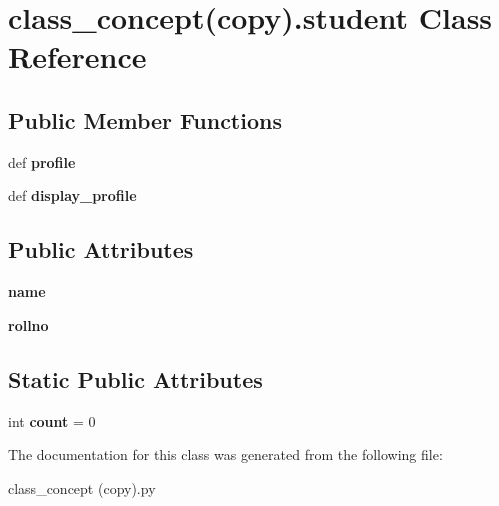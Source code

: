 \hypertarget{classclass__concept_07copy_08_1_1student}{\section{class\-\_\-concept(copy).student Class Reference}
\label{classclass__concept_07copy_08_1_1student}
}
\subsection*{Public Member Functions}
\begin{DoxyCompactItemize}
\item 
\hypertarget{classclass__concept_07copy_08_1_1student_aeb9657d07c96555a74741859256e062c}{def {\bfseries profile}}\label{classclass__concept_07copy_08_1_1student_aeb9657d07c96555a74741859256e062c}

\item 
\hypertarget{classclass__concept_07copy_08_1_1student_a85660f5a0dc4ac1b6c7514f810ea1b04}{def {\bfseries display\-\_\-profile}}\label{classclass__concept_07copy_08_1_1student_a85660f5a0dc4ac1b6c7514f810ea1b04}

\end{DoxyCompactItemize}
\subsection*{Public Attributes}
\begin{DoxyCompactItemize}
\item 
\hypertarget{classclass__concept_07copy_08_1_1student_a934aa90d98458a4e499b8ea37dc1bf7d}{{\bfseries name}}\label{classclass__concept_07copy_08_1_1student_a934aa90d98458a4e499b8ea37dc1bf7d}

\item 
\hypertarget{classclass__concept_07copy_08_1_1student_a89605de4b968b4d989c18aa5b9d6ce96}{{\bfseries rollno}}\label{classclass__concept_07copy_08_1_1student_a89605de4b968b4d989c18aa5b9d6ce96}

\end{DoxyCompactItemize}
\subsection*{Static Public Attributes}
\begin{DoxyCompactItemize}
\item 
\hypertarget{classclass__concept_07copy_08_1_1student_ac1351543d5baebb11904a1618817ab54}{int {\bfseries count} = 0}\label{classclass__concept_07copy_08_1_1student_ac1351543d5baebb11904a1618817ab54}

\end{DoxyCompactItemize}


The documentation for this class was generated from the following file\-:\begin{DoxyCompactItemize}
\item 
class\-\_\-concept (copy).\-py\end{DoxyCompactItemize}
